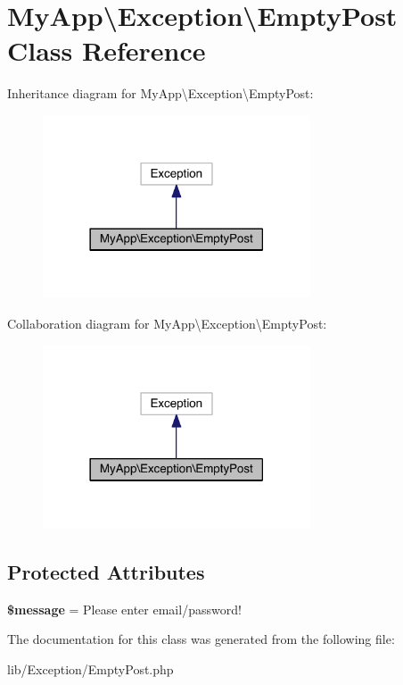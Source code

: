 \hypertarget{class_my_app_1_1_exception_1_1_empty_post}{}\section{My\+App\textbackslash{}Exception\textbackslash{}Empty\+Post Class Reference}
\label{class_my_app_1_1_exception_1_1_empty_post}


Inheritance diagram for My\+App\textbackslash{}Exception\textbackslash{}Empty\+Post\+:
\nopagebreak
\begin{figure}[H]
\begin{center}
\leavevmode
\includegraphics[width=225pt]{class_my_app_1_1_exception_1_1_empty_post__inherit__graph}
\end{center}
\end{figure}


Collaboration diagram for My\+App\textbackslash{}Exception\textbackslash{}Empty\+Post\+:
\nopagebreak
\begin{figure}[H]
\begin{center}
\leavevmode
\includegraphics[width=225pt]{class_my_app_1_1_exception_1_1_empty_post__coll__graph}
\end{center}
\end{figure}
\subsection*{Protected Attributes}
\begin{DoxyCompactItemize}
\item 
{\bfseries \$message} = \textquotesingle{}Please enter email/password!\textquotesingle{}\hypertarget{class_my_app_1_1_exception_1_1_empty_post_a038f2653142cf871d1b0226b8d404d7d}{}\label{class_my_app_1_1_exception_1_1_empty_post_a038f2653142cf871d1b0226b8d404d7d}

\end{DoxyCompactItemize}


The documentation for this class was generated from the following file\+:\begin{DoxyCompactItemize}
\item 
lib/\+Exception/Empty\+Post.\+php\end{DoxyCompactItemize}
